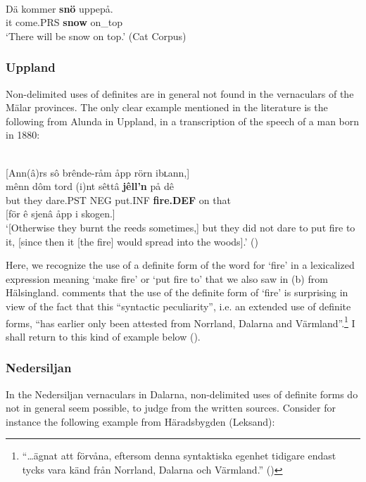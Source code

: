 \ea \label{} 
\\
\gll Dä  kommer  \textbf{snö} uppepå.\\
it  come.PRS  \textbf{snow} on\_top\\
\glt ‘There will be snow on top.’ (Cat Corpus)

\z

\subsubsection{Uppland}
Non-delimited uses of definites are in general not found in the vernaculars of the Mälar provinces. The only clear example mentioned in the literature is the following from Alunda in Uppland, in a transcription of the speech of a man born in 1880:

\ea \label{} 
\\ \label{bkm:Ref154222780}
 {}[Ann(â)rs sô brênde-råm åpp rörn ibʟann,] \\
\gll mênn  dôm  tord  (i)nt  sêttâ  \textbf{jêll’n} på  dê  \\
but  they  dare.PST  NEG  put.INF  \textbf{fire.DEF} on   that  \\
{} [för ê sjenâ åpp i skogen.]\\
\glt ‘[Otherwise they burnt the reeds sometimes,] but they did not dare to put fire to it, [since then it [the fire] would spread into the woods].’ (\citet[60]{Västerlund1988})

\z

Here, we recognize the use of a definite form of the word for ‘fire’ in a lexicalized expression meaning ‘make fire’ or ‘put fire to’ that we also saw in (b) from Hälsingland. \citet[40]{Västerlund1988} comments that the use of the definite form of  ‘fire’ is surprising in view of the fact that this “syntactic peculiarity”, i.e. an extended use of definite forms, “has earlier only been attested from Norrland, Dalarna and Värmland”.\footnote{ “…ägnat att förvåna, eftersom denna syntaktiska egenhet tidigare endast tycks vara känd från Norrland, Dalarna och Värmland.” (\citet[60]{Västerlund1988})} I shall return to this kind of example below ().

\subsubsection{Nedersiljan}
 In the Nedersiljan vernaculars in Dalarna, non-delimited uses of definite forms do not in general seem possible, to judge from the written sources. Consider for instance the following example from Häradsbygden (Leksand):

